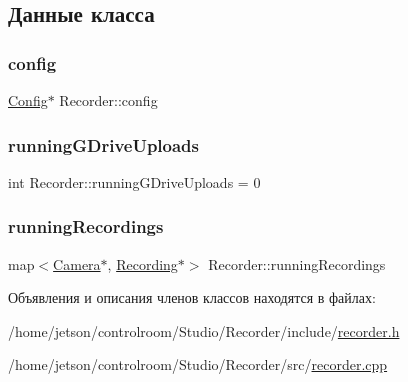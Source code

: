 \subsection{Данные класса}
\mbox{\label{class_recorder_acc5a095c1d30b547c994f817438c054b}} 
\subsubsection{\texorpdfstring{config}{config}}
{\footnotesize\ttfamily \hyperlink{class_config}{Config}$\ast$ Recorder\+::config\hspace{0.3cm}{\ttfamily [private]}}

\mbox{\label{class_recorder_ae18bfd225286a1ebcd3b49de32d129cb}} 
\subsubsection{\texorpdfstring{running\+G\+Drive\+Uploads}{runningGDriveUploads}}
{\footnotesize\ttfamily int Recorder\+::running\+G\+Drive\+Uploads = 0\hspace{0.3cm}{\ttfamily [private]}}

\mbox{\label{class_recorder_a36bc2c958b17808861bd6f8b4204c82e}} 
\subsubsection{\texorpdfstring{running\+Recordings}{runningRecordings}}
{\footnotesize\ttfamily map$<$\hyperlink{struct_camera}{Camera}$\ast$, \hyperlink{class_recording}{Recording}$\ast$$>$ Recorder\+::running\+Recordings\hspace{0.3cm}{\ttfamily [private]}}



Объявления и описания членов классов находятся в файлах\+:\begin{DoxyCompactItemize}
\item 
/home/jetson/controlroom/\+Studio/\+Recorder/include/\hyperlink{recorder_8h}{recorder.\+h}\item 
/home/jetson/controlroom/\+Studio/\+Recorder/src/\hyperlink{recorder_8cpp}{recorder.\+cpp}\end{DoxyCompactItemize}
